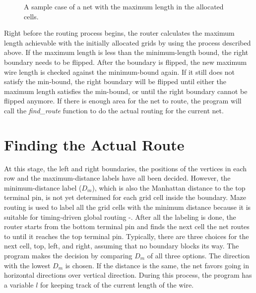 \begin{figure}[here]
  \begin{center}
  \end{center}
  \caption{A sample case of a net with the maximum length in the allocated cells.}
  \label{fig:sample_maxlength}
\end{figure}

Right before the routing process begins, the router calculates the maximum length achievable with the initially allocated grids by using the process described above. If the maximum length is less than the minimum-length bound, the right boundary needs to be flipped. After the boundary is flipped, the new maximum wire length is checked against the minimum-bound again. If it still does not satisfy the min-bound, the right boundary will be flipped until either the maximum length satisfies the min-bound, or until the right boundary cannot be flipped anymore. If there is enough area for the net to route, the program will call the \textit{find\_route} function to do the actual routing for the current net.

\section{Finding the Actual Route}\label{sec-findroute}

At this stage, the left and right boundaries, the positions of the vertices in each row and the maximum-distance labels have all been decided. However, the minimum-distance label ($D_m$), which is also the Manhattan distance to the top terminal pin, is not yet determined for each grid cell inside the boundary. Maze routing is used to label all the grid cells with the minimum distance because it is suitable for timing-driven global routing \cite{IEEEexample:maze}-\cite{IEEEexample:maze2}. After all the labeling is done, the router starts from the bottom terminal pin and finds the next cell the net routes to until it reaches the top terminal pin. Typically, there are three choices for the next cell, top, left, and right, assuming that no boundary blocks its way. The program makes the decision by comparing $D_m$ of all three options. The direction with the lowest $D_m$ is chosen. If the distance is the same, the net favors going in horizontal directions over vertical direction. During this process, the program has a variable $l$ for keeping track of the current length of the wire. 

